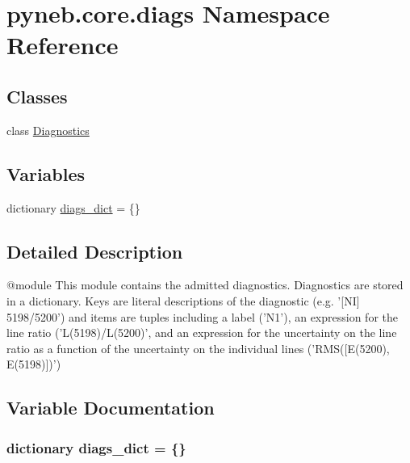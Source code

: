 \hypertarget{namespacepyneb_1_1core_1_1diags}{\section{pyneb.\-core.\-diags Namespace Reference}
\label{namespacepyneb_1_1core_1_1diags}
}
\subsection*{Classes}
\begin{DoxyCompactItemize}
\item 
class \hyperlink{classpyneb_1_1core_1_1diags_1_1_diagnostics}{Diagnostics}
\end{DoxyCompactItemize}
\subsection*{Variables}
\begin{DoxyCompactItemize}
\item 
dictionary \hyperlink{namespacepyneb_1_1core_1_1diags_aefb25006cfca59ac33e32f4f36cf462b}{diags\-\_\-dict} = \{\}
\end{DoxyCompactItemize}


\subsection{Detailed Description}
\begin{DoxyVerb}@module
This module contains the admitted diagnostics.
Diagnostics are stored in a dictionary. Keys are literal descriptions of the diagnostic 
(e.g. '[NI] 5198/5200') and items are tuples including a label ('N1'), an expression for the line ratio ('L(5198)/L(5200)',
and an expression for the uncertainty on the line ratio as a function of the uncertainty on the individual lines ('RMS([E(5200), E(5198)])')\end{DoxyVerb}
 

\subsection{Variable Documentation}
\hypertarget{namespacepyneb_1_1core_1_1diags_aefb25006cfca59ac33e32f4f36cf462b}{
\subsubsection[{diags\-\_\-dict}]{\setlength{\rightskip}{0pt plus 5cm}dictionary diags\-\_\-dict = \{\}}}\label{namespacepyneb_1_1core_1_1diags_aefb25006cfca59ac33e32f4f36cf462b}
